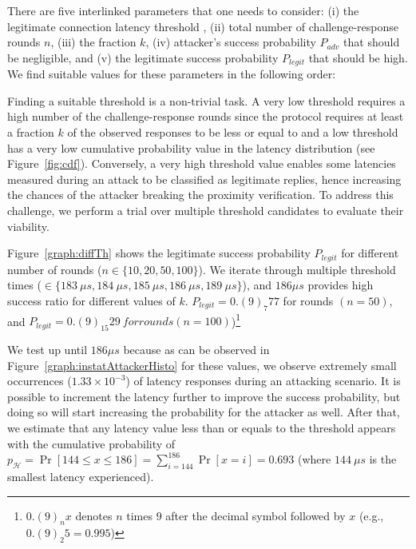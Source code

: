 There are five interlinked parameters that one needs to consider: (i) the legitimate connection latency threshold \connect, (ii) total number of challenge-response rounds $n$, (iii) the fraction $k$, (iv) attacker's success probability $P_{adv}$ that should be negligible, and (v) the legitimate success probability $P_{legit}$ that should be high. We find suitable values for these parameters in the following order:



\newcommand{\mainResultCaption}{\textbf{Distinguishing relay attack.} The attacker's success probability $P_{adv}$ and the legitimate success probability $P_{legit}$ in proximity verification for different number of rounds ($n$) given a fixed $k=0.4$.}


 Finding a suitable threshold \connect is a non-trivial task. A very low threshold requires a high number of the challenge-response rounds since the protocol requires at least a fraction $k$ of the observed responses to be less or equal to \connect and a low threshold has a very low cumulative probability value in the latency distribution (see Figure~\ref{fig:cdf}). Conversely, a very high threshold value enables some latencies measured during an attack to be classified as legitimate replies, hence increasing the chances of the attacker breaking the proximity verification. To address this challenge, we perform a trial over multiple threshold candidates to evaluate their viability.


Figure~\ref{graph:diffTh} shows the legitimate success probability $P_{legit}$ for different number of rounds ($n\in\{10,20,50,100\}$). We iterate through multiple threshold times (\connect$\in\{183\ \mu s,184\ \mu s,185\ \mu s, 186\ \mu s, 189\ \mu s\}$), and $186\mu s$ provides high success ratio for different values of $k$. $P_{legit}=0.(9)_7 77$ for rounds $(n=50)$, and $P_{legit}=0.(9)_15 29\ for rounds (n=100)$)\footnote{$0.(9)_n x$ denotes $n$ times $9$ after the decimal symbol followed by $x$ (e.g., $0.(9)_2 5=0.995$)}

We test \connect up until $186 \mu s$ because as can be observed in Figure~\ref{graph:instatAttackerHisto} for these values, we observe extremely small occurrences ($1.33\times10^{-3}$) of latency responses during an attacking scenario. It is possible to increment the latency further to improve the success probability, but doing so will start increasing the probability for the attacker as well. 
%
After that, we estimate that any latency value less than or equals to the threshold \connect appears with the cumulative probability of $p_{\mathcal{H}} = \Pr[144\leq x \leq 186] = \sum_{i=144}^{186}\Pr[x=i] = 0.693$ (where $144\ \mu s$ is the smallest latency experienced).

